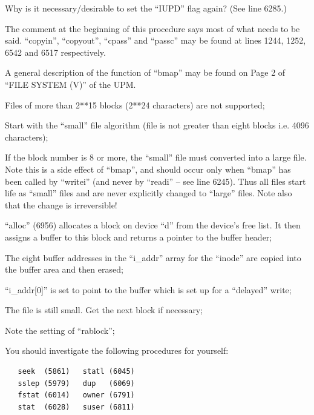 \item[6318:] Why is it necessary/desirable to
 set the ``IUPD'' flag again? (See
 line 6285.)
\ed



The comment at the beginning of this
procedure says most of what needs to be
said. ``copyin'', ``copyout'', ``cpass'' and
``passc'' may be found at lines 1244,
1252, 6542 and 6517 respectively.



A general description of the function
of ``bmap'' may be found on Page 2 of
``FILE SYSTEM (V)'' of the UPM.

\bd
\item[6423:] Files of more than 2**15 blocks
 (2**24 characters) are not supported;

\item[6427:] Start with the ``small'' file algorithm (file is not greater than
 eight blocks i.e. 4096 characters);

\item[6431:] If the block number is 8 or more,
the ``small'' file must converted
into a large file. Note this is
a side effect of ``bmap'', and
should occur only when ``bmap'' has
been called by ``writei'' (and
never by ``readi'' -- see line
6245). Thus all files start life
as ``small'' files and are never
explicitly changed to ``large''
files. Note also that the change
is irreversible!

\item[6435:] ``alloc'' (6956) allocates a block
on device ``d'' from the device's
free list. It then assigns a
buffer to this block and returns
a pointer to the buffer header;

\item[6438:] The eight buffer addresses in the
``i\_addr'' array for the ``inode''
are copied into the buffer area
and then erased;

\item[6442:] ``i\_addr[0]'' is set to point to
 the buffer which is set up for a
 ``delayed'' write;

\item[6448:] The file is still small. Get the
next block if necessary;

\item[6456:] Note the setting of ``rablock'';
\ed


You should investigate the following
procedures for yourself:

\begin{verbatim}
   seek  (5861)   statl (6045)
   sslep (5979)   dup   (6069)
   fstat (6014)   owner (6791)
   stat  (6028)   suser (6811)
\end{verbatim}
